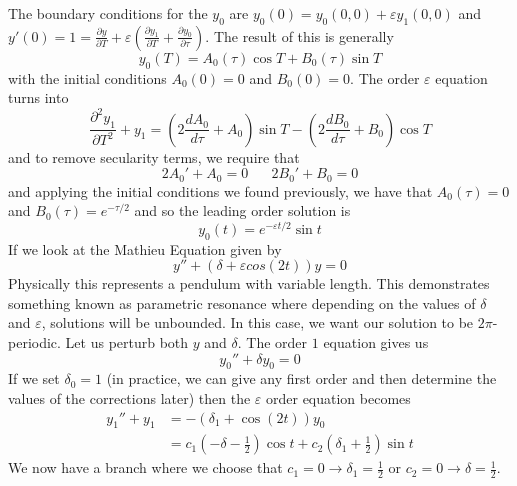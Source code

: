 \documentclass{article}
\newcommand{\pd}[2]{\frac{\partial #1}{\partial #2}}
\newcommand{\od}[2]{\frac{d #1}{d #2}}
\newcommand{\pdt}[2]{\frac{\partial ^2 #1}{\partial #2 ^2}}
\newcommand{\twen}{\hspace{20pt}}
\begin{document}
The boundary conditions for the $y_0$ are $y_0(0) = y_0(0,0)+\varepsilon y_1(0,0)$ and $y'(0) = 1 = \pd{y}{T} + \varepsilon \left( \pd{y_1}{T} + \pd{y_0}{\tau} \right) $. The result of this is generally 
\begin{equation*}
    y_0 (T) = A_0(\tau) \cos T + B_0(\tau) \sin T
\end{equation*}
with the initial conditions $A_0(0)=0$ and $B_0(0)=0$. The order $\varepsilon$ equation turns into 
\begin{equation*}
    \pdt{y_1}{T} +y _1 = \left( 2 \od{A_0}{\tau} + A_0\right) \sin T - \left( 2\od{B_0}{\tau} + B_0 \right) \cos T
\end{equation*}
and to remove secularity terms, we require that 
\begin{equation*}
    2A_0'+A_0 =0 \twen 2B_0' +B_0 =0 
\end{equation*}
and applying the initial conditions we found previously, we have that $A_0(\tau ) =0$ and $B_0(\tau) =e^{-\tau/2}$ and so the leading order solution is 
\begin{equation*}
    y_0(t) = e^{-\varepsilon t/2}\sin t
\end{equation*}
If we look at the Mathieu Equation given by 
\begin{equation*}
    y''+(\delta +\varepsilon cos(2t))y = 0
\end{equation*}
Physically this represents a pendulum with variable length. This demonstrates something known as parametric resonance where depending on the values of $\delta$ and $\varepsilon$, solutions will be unbounded. In this case, we want our solution to be $2\pi$-periodic. Let us perturb both $y$ and $\delta$. The order $1$ equation gives us 
\begin{equation*}
    y_0'' + \delta y_0 =0
\end{equation*}
If we set $\delta_0=1$ (in practice, we can give any first order and then determine the values of the corrections later) then the $\varepsilon$ order equation becomes 
\begin{equation*}
    \begin{split}
        y_1 ''+y_1 &= -(\delta_1 + \cos (2t))y_0 \\
        &= c_1\left(-\delta - \frac{1}{2}\right)\cos t+c_2 \left( \delta_1 +\frac{1}{2} \right) \sin t
    \end{split}
\end{equation*}
We now have a branch where we choose that $c_1=0\to \delta_1 = \frac{1}{2}$ or $c_2 =0 \to \delta = \frac{1}{2}$.
\end{document}
